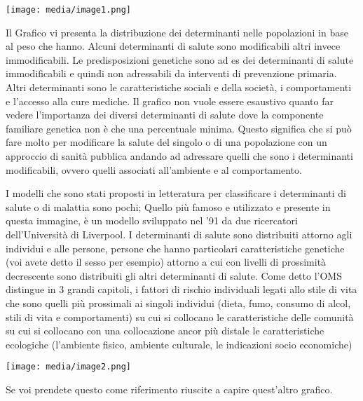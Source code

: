 \documentclass[]{article}
\begin{document}
\texttt{[image: media/image1.png]}

Il Grafico vi presenta la distribuzione dei determinanti nelle
popolazioni in base al peso che hanno. Alcuni determinanti di salute
sono modificabili altri invece immodificabili. Le predisposizioni
genetiche sono ad es dei determinanti di salute immodificabili e quindi
non adressabili da interventi di prevenzione primaria. Altri
determinanti sono le caratteristiche sociali e della società, i
comportamenti e l'accesso alla cure mediche. Il grafico non vuole essere
esaustivo quanto far vedere l'importanza dei diversi determinanti di
salute dove la componente familiare genetica non è che una percentuale
minima. Questo significa che si può fare molto per modificare la salute
del singolo o di una popolazione con un approccio di sanità pubblica
andando ad adressare quelli che sono i determinanti modificabili, ovvero
quelli associati all'ambiente e al comportamento.

I modelli che sono stati proposti in letteratura per classificare i
determinanti di salute o di malattia sono pochi; Quello più famoso e
utilizzato e presente in questa immagine, è un modello sviluppato nel
'91 da due ricercatori dell'Università di Liverpool. I determinanti di
salute sono distribuiti attorno agli individui e alle persone, persone
che hanno particolari caratteristiche genetiche (voi avete detto il
sesso per esempio) attorno a cui con livelli di prossimità decrescente
sono distribuiti gli altri determinanti di salute. Come detto l'OMS
distingue in 3 grandi capitoli, i fattori di rischio individuali legati
allo stile di vita che sono quelli più prossimali ai singoli individui
(dieta, fumo, consumo di alcol, stili di vita e comportamenti) su cui si
collocano le caratteristiche delle comunità su cui si collocano con una
collocazione ancor più distale le caratteristiche ecologiche (l'ambiente
fisico, ambiente culturale, le indicazioni socio economiche)

\texttt{[image: media/image2.png]}

Se voi prendete questo come riferimento riuscite a capire quest'altro
grafico.
\end{document}
